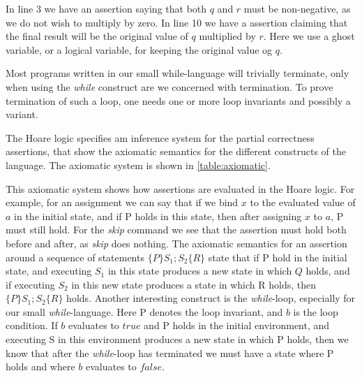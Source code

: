 In line 3 we have an assertion saying that both $q$ and $r$ must be non-negative, as we do not wish to multiply by zero.
In line 10 we have a assertion claiming that the final result will be the original value of $q$ multiplied by $r$. Here we use a ghost variable, or a logical variable, for keeping the original value og $q$.

Most programs written in our small while-language will trivially terminate, only when using the \textit{while} construct are we concerned with termination. To prove termination of such a loop, one needs one or more loop invariants and possibly a variant. 



The Hoare logic specifies am inference system for the partial correctness assertions, that show the axiomatic semantics for the different constructs of the language. The axiomatic system is shown in \autoref{table:axiomatic}.

This axiomatic system shows how assertions are evaluated in the Hoare logic. For example, for an assignment we can say that if we bind $x$ to the evaluated value of $a$ in the initial state, and if P holds in this state, then after assigning $x$ to $a$, P must still hold.
For the \textit{skip} command we see that the assertion must hold both before and after, as \textit{skip} does nothing.
The axiomatic semantics for an assertion around a sequence of statements $\{P\} S_1;S_2\{R\}$ state that if P hold in the initial state, and executing $S_1$ in this state produces a new state in which $Q$ holds, and if executing $S_2$ in this new state produces a state in which R holds, then $\{P\} S_1;S_2 \{R\}$ holds.
Another interesting construct is the \textit{while}-loop, especially for our small \textit{while}-language.
Here P denotes the loop invariant, and $b$ is the loop condition. If $b$ evaluates to $true$ and P holds in the initial environment, and executing S in this environment produces a new state in which P holds, then we know that after the \textit{while}-loop has terminated we must have a state where P holds and where $b$ evaluates to $false$.

